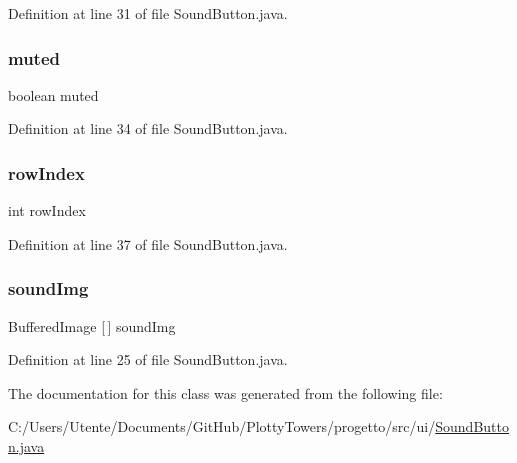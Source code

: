 Definition at line 31 of file Sound\+Button.\+java.

\mbox{\label{classui_1_1_sound_button_a1d5ea61013609113129f4a6aaa99c5cd}} 
\subsubsection{\texorpdfstring{muted}{muted}}
{\footnotesize\ttfamily boolean muted\hspace{0.3cm}{\ttfamily [private]}}



Definition at line 34 of file Sound\+Button.\+java.

\mbox{\label{classui_1_1_sound_button_aa472bc4708470ef0afc61d3c18896ec9}} 
\subsubsection{\texorpdfstring{row\+Index}{rowIndex}}
{\footnotesize\ttfamily int row\+Index\hspace{0.3cm}{\ttfamily [private]}}



Definition at line 37 of file Sound\+Button.\+java.

\mbox{\label{classui_1_1_sound_button_a6bfb47041497c4df05a45081b935f60b}} 
\subsubsection{\texorpdfstring{sound\+Img}{soundImg}}
{\footnotesize\ttfamily Buffered\+Image \mbox{[}$\,$\mbox{]} sound\+Img\hspace{0.3cm}{\ttfamily [private]}}



Definition at line 25 of file Sound\+Button.\+java.



The documentation for this class was generated from the following file\+:\begin{DoxyCompactItemize}
\item 
C\+:/\+Users/\+Utente/\+Documents/\+Git\+Hub/\+Plotty\+Towers/progetto/src/ui/\hyperlink{_sound_button_8java}{Sound\+Button.\+java}\end{DoxyCompactItemize}
